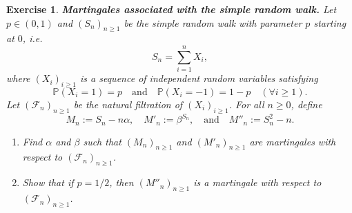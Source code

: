 \documentclass{article}
\newtheorem{exercise}[theorem]{Exercise}
\begin{document}
\begin{exercise}
\textbf{Martingales associated with the simple random walk.}  
Let $p \in (0,1)$ and $(S_n)_{n \geq 1}$ be the simple random walk with parameter $p$ starting at $0$, i.e.
\[
S_n = \sum_{i=1}^n X_i,
\]
where $(X_i)_{i \geq 1}$ is a sequence of independent random variables satisfying  
\[
\mathbb{P}(X_i = 1) = p \quad \text{and} \quad \mathbb{P}(X_i = -1) = 1 - p \quad (\forall i \geq 1).
\]
Let $(\mathcal{F}_n)_{n \geq 1}$ be the natural filtration of $(X_i)_{i \geq 1}$.  
For all $n \geq 0$, define
\[
M_n := S_n - n\alpha, \quad M'_n := \beta^{S_n}, \quad \text{and} \quad M''_n := S_n^2 - n.
\]
\begin{enumerate}
\item[(a)] Find $\alpha$ and $\beta$ such that $(M_n)_{n \geq 1}$ and $(M'_n)_{n \geq 1}$ are martingales with respect to $(\mathcal{F}_n)_{n \geq 1}$.

\item[(b)] Show that if $p = 1/2$, then $(M''_n)_{n \geq 1}$ is a martingale with respect to $(\mathcal{F}_n)_{n \geq 1}$.
\end{enumerate}
\end{exercise}
\end{document}

